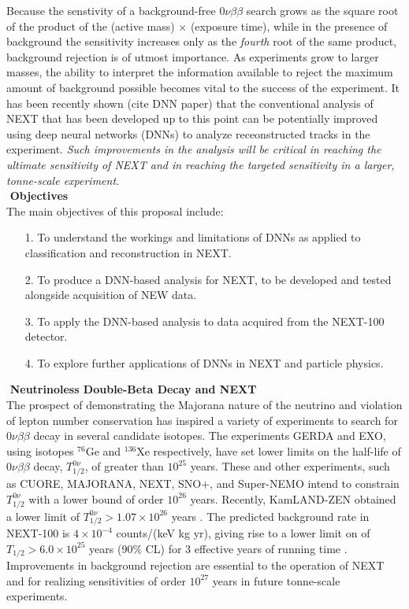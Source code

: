 \documentclass[11pt,a4paper]{article}
\begin{document}
Because the senstivity of a background-free $0\nu\beta\beta$ search grows as the square root of the product of the (active mass) $\times$ (exposure time), while in the presence of background the sensitivity increases only as the \emph{fourth} root of the same product, background rejection is of utmost importance. As experiments grow to larger masses, the ability to interpret the information available to reject the maximum amount of background possible becomes vital to the success of the experiment.  It has been recently shown (cite DNN paper) that the conventional analysis of NEXT that has been developed up to this point can be potentially improved using deep neural networks (DNNs) to analyze receonstructed tracks in the experiment. \emph{Such improvements in the analysis will be critical in reaching the ultimate sensitivity of NEXT and in reaching the targeted sensitivity in a larger, tonne-scale experiment.}\\

\noindent\textbf{\textbullet\,\,Objectives}\\
The main objectives of this proposal include:

\begin{enumerate}[itemsep=-1mm]
	\item[1.] To understand the workings and limitations of DNNs as applied to classification and reconstruction in NEXT.
	\item[2.] To produce a DNN-based analysis for NEXT, to be developed and tested alongside acquisition of NEW data.
	\item[3.] To apply the DNN-based analysis to data acquired from the NEXT-100 detector.
	\item[4.] To explore further applications of DNNs in NEXT and particle physics.
\end{enumerate}

\noindent\textbf{\textbullet\,\,Neutrinoless Double-Beta Decay and NEXT}\\
The prospect of demonstrating the Majorana nature of the neutrino and violation of lepton number conservation has inspired a variety of experiments to search for $0\nu\beta\beta$ decay in several candidate isotopes.  The experiments GERDA and EXO, using isotopes $^{76}$Ge and $^{136}$Xe respectively, have set lower limits on the half-life of $0\nu\beta\beta$ decay, $T_{1/2}^{0\nu}$, of greater than $10^{25}$ years.  These and other experiments, such as CUORE, MAJORANA, NEXT, SNO+, and Super-NEMO intend to constrain $T_{1/2}^{0\nu}$ with a lower bound of order $10^{26}$ years.  Recently, KamLAND-ZEN obtained a lower limit of $T_{1/2}^{0\nu} > 1.07\times 10^{26}$ years \cite{KamLANDZen_2016}. The predicted background rate in NEXT-100 is $4 \times 10^{-4}$ counts/(keV kg yr), giving rise to a lower limit on  of $T_{1/2} > 6.0\times 10^{25}$ years (90\% CL) for 3 effective years of running time \cite{NEXT_sensitivity}.  Improvements in background rejection are essential to the operation of NEXT and for realizing sensitivities of order $10^{27}$ years in future tonne-scale experiments.
\end{document}
